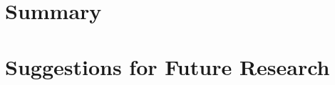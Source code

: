 \section{Summary}
\label{sec:summary}



\section{Suggestions for Future Research}
\label{sec:future_research}


